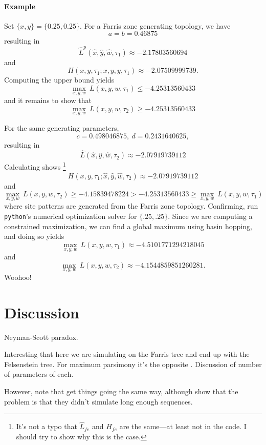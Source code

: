 \documentclass[a4paper]{article}
\begin{document}
\paragraph{Example}

Set $\{x, y\} = \{0.25, 0.25\}$.
For a Farris zone generating topology, we have
$$
a = b = 0.46875
$$
resulting in
$$
\hat{L}^{p}(\hat{x}, \hat{y}, \hat{w},\tau_1) \approx -2.17803560694
$$
and
$$
H(x,y,\tau_1;x,y,y,\tau_1) \approx -2.07509999739.
$$
Computing the upper bound yields
$$
\max_{x,y,w} \ L(x,y,w,\tau_1) \le -4.25313560433
$$
and it remains to show that
$$
\max_{x,y,w} \ L(x,y,w,\tau_2) \ge -4.25313560433
$$

For the same generating parameters,
$$
c = 0.498046875, \ d = 0.2431640625,
$$
resulting in
$$
\hat{L}(\hat{x}, \hat{y}, \hat{w},\tau_2) \approx -2.07919739112
$$
Calculating shows%
    \footnote{It's not a typo that $\hat{L}_{fe}$ and $H_{fe}$ are the same---at least not in the code.
        I should try to show why this is the case.
        }
$$
H(x,y,\tau_1; \hat{x}, \hat{y}, \hat{w},\tau_2) \approx -2.07919739112
$$
and
$$
\max_{x,y,w} \ L(x,y,w,\tau_2) \ge -4.15839478224 > -4.25313560433 \ge \max_{x,y,w} \ L(x,y,w,\tau_1)
$$
where site patterns are generated from the Farris zone topology.
Confirming, run \texttt{python}'s numerical optimization solver for $\{.25, .25\}$.
Since we are computing a constrained maximization, we can find a global maximum using basin hopping, and doing so yields
$$
\max_{x,y,w} \ L(x,y,w,\tau_1) \approx -4.5101771294218045
$$
and
$$
\max_{x,y,w} \ L(x,y,w,\tau_2) \approx -4.1544859851260281.
$$
Woohoo!



\section{Discussion}

Neyman-Scott paradox.

Interesting that here we are simulating on the Farris tree and end up with the Felsenstein tree.
For maximum parsimony it's the opposite \cite{Felsenstein1978-rr}.
Discussion of number of parameters of each.

However, note that \cite{Siddall1998-hq} get things going the same way, although \cite{Swofford2001-hr} show that the problem is that they didn't simulate long enough sequences.



\end{document}
